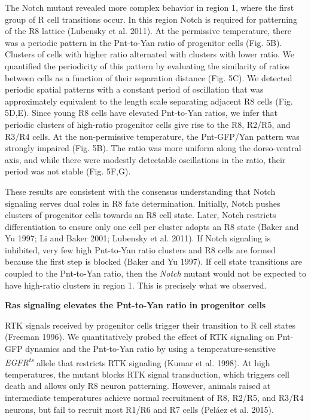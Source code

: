 The Notch mutant revealed more complex behavior in region 1, where the first group of R cell transitions occur. In this region Notch is required for patterning of the R8 lattice (Lubensky et al. 2011). At the permissive temperature, there was a periodic pattern in the Pnt-to-Yan ratio of progenitor cells (Fig. 5B). Clusters of cells with higher ratio alternated with clusters with lower ratio. We quantified the periodicity of this pattern by evaluating the similarity of ratios between cells as a function of their separation distance (Fig. 5C). We detected periodic spatial patterns with a constant period of oscillation that was approximately equivalent to the length scale separating adjacent R8 cells (Fig. 5D,E). Since young R8 cells have elevated Pnt-to-Yan ratios, we infer that periodic clusters of high-ratio progenitor cells give rise to the R8, R2/R5, and R3/R4 cells. At the non-permissive temperature, the Pnt-GFP/Yan pattern was strongly impaired (Fig. 5B). The ratio was more uniform along the dorso-ventral axis, and while there were modestly detectable oscillations in the ratio, their period was not stable (Fig. 5F,G).

These results are consistent with the consensus understanding that Notch signaling serves dual roles in R8 fate determination. Initially, Notch pushes clusters of progenitor cells towards an R8 cell state. Later, Notch restricts differentiation to ensure only one cell per cluster adopts an R8 state (Baker and Yu 1997; Li and Baker 2001; Lubensky et al. 2011). If Notch signaling is inhibited, very few high Pnt-to-Yan ratio clusters and R8 cells are formed because the first step is blocked (Baker and Yu 1997). If cell state transitions are coupled to the Pnt-to-Yan ratio, then the \emph{Notch} mutant would not be expected to have high-ratio clusters in region 1. This is precisely what we observed.

\textbf{Ras signaling elevates the Pnt-to-Yan ratio in progenitor cells}

RTK signals received by progenitor cells trigger their transition to R cell states (Freeman 1996). We quantitatively probed the effect of RTK signaling on Pnt-GFP dynamics and the Pnt-to-Yan ratio by using a temperature-sensitive \emph{EGFR\textsuperscript{ts}} allele that restricts RTK signaling (Kumar et al. 1998). At high temperatures, the mutant blocks RTK signal transduction, which triggers cell death and allows only R8 neuron patterning. However, animals raised at intermediate temperatures achieve normal recruitment of R8, R2/R5, and R3/R4 neurons, but fail to recruit most R1/R6 and R7 cells (Peláez et al. 2015).

